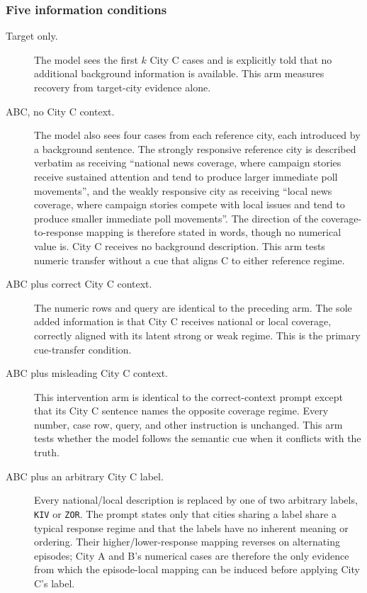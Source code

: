 \subsubsection{Five information conditions}
\begin{description}
  \item[Target only.]
  The model sees the first \(k\) City C cases and is explicitly told that no
  additional background information is available. This arm measures recovery
  from target-city evidence alone.

  \item[ABC, no City C context.]
  The model also sees four cases from each reference city, each introduced by a
  background sentence. The strongly responsive reference city is described
  verbatim as receiving ``national news coverage, where campaign stories receive
  sustained attention and tend to produce larger immediate poll movements'', and
  the weakly responsive city as receiving ``local news coverage, where campaign
  stories compete with local issues and tend to produce smaller immediate poll
  movements''. The direction of the coverage-to-response mapping is therefore
  stated in words, though no numerical value is. City C receives no background
  description. This arm tests numeric transfer without a cue that aligns C to
  either reference regime.

  \item[ABC plus correct City C context.]
  The numeric rows and query are identical to the preceding arm. The sole added
  information is that City C receives national or local coverage, correctly
  aligned with its latent strong or weak regime. This is the primary cue-transfer
  condition.

  \item[ABC plus misleading City C context.]
  This intervention arm is identical to the correct-context prompt except that its
  City C sentence names the opposite coverage regime. Every number, case row,
  query, and other instruction is unchanged. This arm tests whether the model
  follows the semantic cue when it conflicts with the truth.

  \item[ABC plus an arbitrary City C label.]
  Every national/local description is replaced by one of two arbitrary labels,
  \texttt{KIV} or \texttt{ZOR}. The prompt states only that cities sharing a label
  share a typical response regime and that the labels have no inherent meaning or
  ordering. Their higher/lower-response mapping reverses on alternating episodes;
  City A and B's numerical cases are therefore the only evidence from which the
  episode-local mapping can be induced before applying City C's label.
\end{description}

